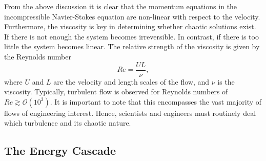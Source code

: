 From the above discussion it is clear that the momentum equations in the incompressible Navier-Stokes equation are non-linear with respect to the velocity. Furthermore, the viscosity is key in determining whether chaotic solutions exist. If there is not enough the system becomes irreversible. In contrast, if there is too little the system becomes linear. The relative strength of the viscosity is given by the Reynolds number
\begin{equation}
	Re = \frac{UL}{\nu},
\end{equation}
where $U$ and $L$ are the velocity and length scales of the flow, and $\nu$ is the viscosity. Typically, turbulent flow is observed for Reynolds numbers of $Re \gtrsim \mathcal{O}(10^3)$. It is important to note that this encompasses the vast majority of flows of engineering interest. Hence, scientists and engineers must routinely deal which turbulence and its chaotic nature.

\subsection{The Energy Cascade}
